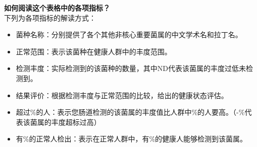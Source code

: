 \documentclass[UTF8]{ctexart}
\begin{document}
\begin{tcolorbox}[
    enhanced,
    colback=lightpurple!5, %
    colframe=white,  %
    arc=3mm,
    boxrule=0.5pt,
    width=\textwidth,
    top=8pt,
    bottom=8pt
]
{\small{\color{lightpurple}\faQuestionCircle}\quad \textbf{如何阅读这个表格中的各项指标？}\\
{\color{orange!50}\faComments}\quad 下列为各项指标的解读方式：
\begin{itemize}
    \item 菌种名称：分别提供了各个其他非核心重要菌属的中文学术名和拉丁名。
    \item 正常范围：表示该菌种在健康人群中的丰度范围。
    \item 检测丰度：实际检测到的该菌种的数量，其中ND代表该菌属的丰度过低未检测到。
    \item 结果评价：根据检测丰度与正常范围的比较，给出的健康状态评估。
    \item 超过\%的人：表示您肠道检测的该菌属的丰度值比人群中\%的人要高。（-\%代表该菌属的丰度超标过高）
    \item 有\%的正常人检出：表示在正常人群中，有\%的健康人能够检测到该菌属。
\end{itemize}
}
\end{tcolorbox}
\vspace{-0.5cm}
\end{document}
